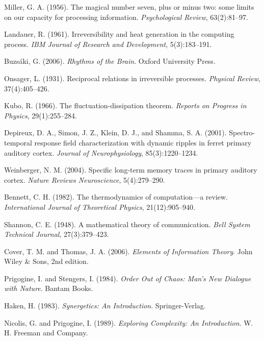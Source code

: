 \documentclass[12pt,a4paper]{article}
\begin{document}
\begin{thebibliography}{99}
Miller, G. A. (1956). The magical number seven, plus or minus two: some limits on our capacity for processing information. \textit{Psychological Review}, 63(2):81--97.

Landauer, R. (1961). Irreversibility and heat generation in the computing process. \textit{IBM Journal of Research and Development}, 5(3):183--191.

Buzsáki, G. (2006). \textit{Rhythms of the Brain}. Oxford University Press.

Onsager, L. (1931). Reciprocal relations in irreversible processes. \textit{Physical Review}, 37(4):405--426.

Kubo, R. (1966). The fluctuation-dissipation theorem. \textit{Reports on Progress in Physics}, 29(1):255--284.

Depireux, D. A., Simon, J. Z., Klein, D. J., and Shamma, S. A. (2001). Spectro-temporal response field characterization with dynamic ripples in ferret primary auditory cortex. \textit{Journal of Neurophysiology}, 85(3):1220--1234.

Weinberger, N. M. (2004). Specific long-term memory traces in primary auditory cortex. \textit{Nature Reviews Neuroscience}, 5(4):279--290.

Bennett, C. H. (1982). The thermodynamics of computation—a review. \textit{International Journal of Theoretical Physics}, 21(12):905--940.

Shannon, C. E. (1948). A mathematical theory of communication. \textit{Bell System Technical Journal}, 27(3):379--423.

Cover, T. M. and Thomas, J. A. (2006). \textit{Elements of Information Theory}. John Wiley \& Sons, 2nd edition.

Prigogine, I. and Stengers, I. (1984). \textit{Order Out of Chaos: Man's New Dialogue with Nature}. Bantam Books.

Haken, H. (1983). \textit{Synergetics: An Introduction}. Springer-Verlag.

Nicolis, G. and Prigogine, I. (1989). \textit{Exploring Complexity: An Introduction}. W. H. Freeman and Company.

\end{thebibliography}
\end{document}
